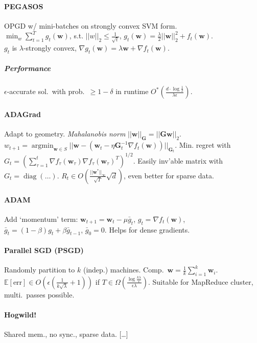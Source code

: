 \documentclass[a4paper, 9pt, DIV=24]{scrartcl}
\DeclareMathOperator{\diag}{diag}
\DeclareMathOperator{\argmin}{argmin}
\newcommand{\eps}{\epsilon}
\newcommand{\E}{\mathbb{E}}
\begin{document}
\begin{twocolumn}
\paragraph{PEGASOS}
OPGD w/ mini-batches on strongly convex SVM form. \\
$\min_w \sum_{t=1}^{T} g_t(\bm w)$, s.t. $||w||_2 \leq \frac{1}{\sqrt t}$, $g_t(\bm w) = \frac{\lambda}{2}||\bm w||_2^2 + f_t(\bm w)$. \\
$g_t$ is $\lambda$-strongly convex, $\nabla g_t(\bm w) = \lambda \bm w + \nabla f_t(\bm w)$.
\subparagraph{Performance} $\eps$-accurate sol.\ with prob.\ $\geq 1-\delta$ in runtime $O^*(\frac{d\cdot\log\frac{1}{\delta}}{\lambda\eps}).$

\paragraph{ADAGrad}
Adapt to geometry.
\emph{Mahalanobis norm} $||\bm w||_{\bm G} = ||\bm G\bm w||_2$. \\
$w_{t+1}=\argmin_{\bm w\in S}||\bm w - (\bm w_t - \eta \bm G_t^{-1}\nabla f_t(\bm w))||_{\bm G_t}$.
Min. regret with $G_t = (\sum_{\tau = 1}^{t} \nabla f_\tau(\bm w_\tau)\nabla f_\tau(\bm w_\tau)^T)^{1/2}.$
Easily inv'able matrix with $G_t = \diag(\dots).$
$R_t \in O(\frac{||\bm w^*||_\infty}{\sqrt T}\sqrt d)$, even better for sparse data.

\paragraph{ADAM}
Add `momentum' term: $\bm w_{t+1} = \bm w_t - \mu\bar g_t$, $g_t = \nabla f_t(\bm w)$, $\bar g_t = (1-\beta)g_t + \beta \bar g_{t-1}$, $\bar g_0 = 0$.
Helps for dense gradients.

\paragraph{Parallel SGD (PSGD)}
Randomly partition to $k$ (indep.) machines. Comp.\ $\bm w = \frac{1}{k}\sum_{i=1}^k \bm w_i$.
$\E[\text{err}] \in O(\eps(\frac{1}{k\sqrt\lambda}+1))$ if $T \in \Omega(\frac{\log \frac{k\lambda}{\eps}}{\eps\lambda})$.
Suitable for MapReduce cluster, multi.\ passes possible.

\paragraph{Hogwild!}
Shared mem., no sync., sparse data. [\dots]


\end{twocolumn}
\end{document}
